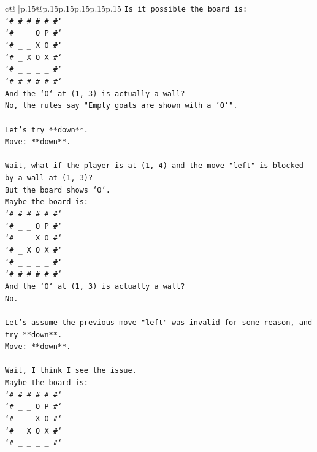 \documentclass{article}
\begin{document}
{\begin{supertabular}{c@{$\;$}|p{.15\linewidth}@{}p{.15\linewidth}p{.15\linewidth}p{.15\linewidth}p{.15\linewidth}p{.15\linewidth}}
{{{\texttt{Is it possible the board is:} \\
\texttt{`\# \# \# \# \# \#`} \\
\texttt{`\# \_ \_ O P \#`} \\
\texttt{`\# \_ \_ X O \#`} \\
\texttt{`\# \_ X O X \#`} \\
\texttt{`\# \_ \_ \_ \_ \#`} \\
\texttt{`\# \# \# \# \# \#`} \\
\texttt{And the `O` at (1, 3) is actually a wall?} \\
\texttt{No, the rules say "Empty goals are shown with a 'O'".} \\
\\ 
\texttt{Let's try **down**.} \\
\texttt{Move: **down**.} \\
\\ 
\texttt{Wait, what if the player is at (1, 4) and the move "left" is blocked by a wall at (1, 3)?} \\
\texttt{But the board shows `O`.} \\
\texttt{Maybe the board is:} \\
\texttt{`\# \# \# \# \# \#`} \\
\texttt{`\# \_ \_ O P \#`} \\
\texttt{`\# \_ \_ X O \#`} \\
\texttt{`\# \_ X O X \#`} \\
\texttt{`\# \_ \_ \_ \_ \#`} \\
\texttt{`\# \# \# \# \# \#`} \\
\texttt{And the `O` at (1, 3) is actually a wall?} \\
\texttt{No.} \\
\\ 
\texttt{Let's assume the previous move "left" was invalid for some reason, and try **down**.} \\
\texttt{Move: **down**.} \\
\\ 
\texttt{Wait, I think I see the issue.} \\
\texttt{Maybe the board is:} \\
\texttt{`\# \# \# \# \# \#`} \\
\texttt{`\# \_ \_ O P \#`} \\
\texttt{`\# \_ \_ X O \#`} \\
\texttt{`\# \_ X O X \#`} \\
\texttt{`\# \_ \_ \_ \_ \#`} \\
}}}
\end{supertabular}}
\end{document}
